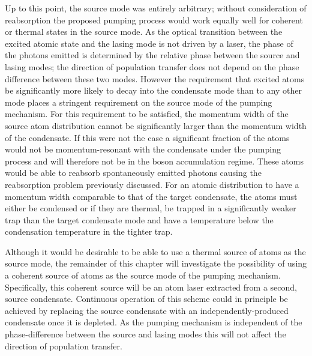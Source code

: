 Up to this point, the source mode was entirely arbitrary; without consideration of reabsorption the proposed pumping process would work equally well for coherent or thermal states in the source mode.  As the optical transition between the excited atomic state and the lasing mode is not driven by a laser, the phase of the photons emitted is determined by the relative phase between the source and lasing modes; the direction of population transfer does not depend on the phase difference between these two modes. However the requirement that excited atoms be significantly more likely to decay into the condensate mode than to any other mode places a stringent requirement on the source mode of the pumping mechanism.  For this requirement to be satisfied, the momentum width of the source atom distribution cannot be significantly larger than the momentum width of the condensate.  If this were not the case a significant fraction of the atoms would not be momentum-resonant with the condensate under the pumping process and will therefore not be in the boson accumulation regime.  These atoms would be able to reabsorb spontaneously emitted photons causing the reabsorption problem previously discussed.  For an atomic distribution to have a momentum width comparable to that of the target condensate, the atoms must either be condensed or if they are thermal, be trapped in a significantly weaker trap than the target condensate mode and have a temperature below the condensation temperature in the tighter trap.  

Although it would be desirable to be able to use a thermal source of atoms as the source mode, the remainder of this chapter will investigate the possibility of using a coherent source of atoms as the source mode of the pumping mechanism.  Specifically, this coherent source will be an atom laser extracted from a second, source condensate.  Continuous operation of this scheme could in principle be achieved by replacing the source condensate with an independently-produced condensate once it is depleted.  As the pumping mechanism is independent of the phase-difference between the source and lasing modes this will not affect the direction of population transfer.

